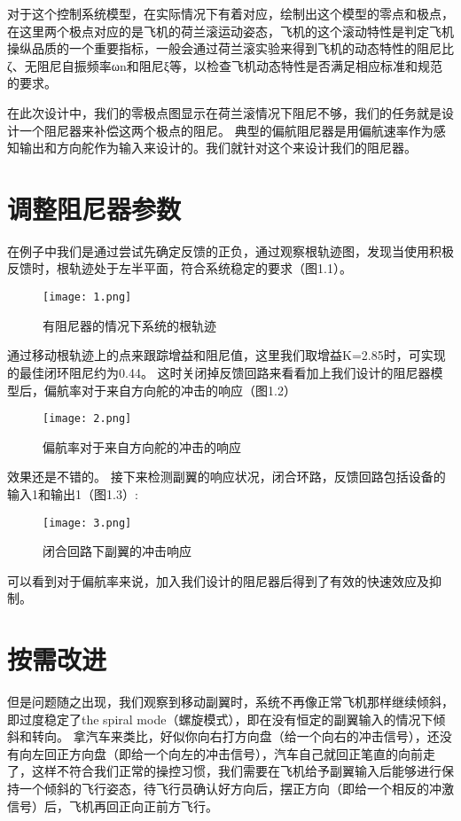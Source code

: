 \documentclass[AutoFakeBold]{LZUThesis}
\begin{document}
对于这个控制系统模型，在实际情况下有着对应，绘制出这个模型的零点和极点，在这里两个极点对应的是飞机的荷兰滚运动姿态，飞机的这个滚动特性是判定飞机操纵品质的一个重要指标，一般会通过荷兰滚实验来得到飞机的动态特性的阻尼比ζ、无阻尼自振频率ωn和阻尼ξ等，以检查飞机动态特性是否满足相应标准和规范的要求。

在此次设计中，我们的零极点图显示在荷兰滚情况下阻尼不够，我们的任务就是设计一个阻尼器来补偿这两个极点的阻尼。
典型的偏航阻尼器是用偏航速率作为感知输出和方向舵作为输入来设计的。我们就针对这个来设计我们的阻尼器。

\section{调整阻尼器参数}
在例子中我们是通过尝试先确定反馈的正负，通过观察根轨迹图，发现当使用积极反馈时，根轨迹处于左半平面，符合系统稳定的要求（图1.1）。

\begin{figure}[htbp]
    \centering
    \texttt{[image: 1.png]}
    \caption{有阻尼器的情况下系统的根轨迹}
\end{figure}

通过移动根轨迹上的点来跟踪增益和阻尼值，这里我们取增益K=2.85时，可实现的最佳闭环阻尼约为0.44。
这时关闭掉反馈回路来看看加上我们设计的阻尼器模型后，偏航率对于来自方向舵的冲击的响应（图1.2）

\begin{figure}[htbp]
    \centering
    \texttt{[image: 2.png]}
    \caption{偏航率对于来自方向舵的冲击的响应}
\end{figure}

效果还是不错的。
接下来检测副翼的响应状况，闭合环路，反馈回路包括设备的输入1和输出1（图1.3）:

\begin{figure}[htbp]
    \centering
    \texttt{[image: 3.png]}
    \caption{闭合回路下副翼的冲击响应}
\end{figure}

可以看到对于偏航率来说，加入我们设计的阻尼器后得到了有效的快速效应及抑制。

\section{按需改进}
但是问题随之出现，我们观察到移动副翼时，系统不再像正常飞机那样继续倾斜，即过度稳定了the spiral mode（螺旋模式），即在没有恒定的副翼输入的情况下倾斜和转向。
拿汽车来类比，好似你向右打方向盘（给一个向右的冲击信号），还没有向左回正方向盘（即给一个向左的冲击信号），汽车自己就回正笔直的向前走了，这样不符合我们正常的操控习惯，我们需要在飞机给予副翼输入后能够进行保持一个倾斜的飞行姿态，待飞行员确认好方向后，摆正方向（即给一个相反的冲激信号）后，飞机再回正向正前方飞行。
\end{document}
